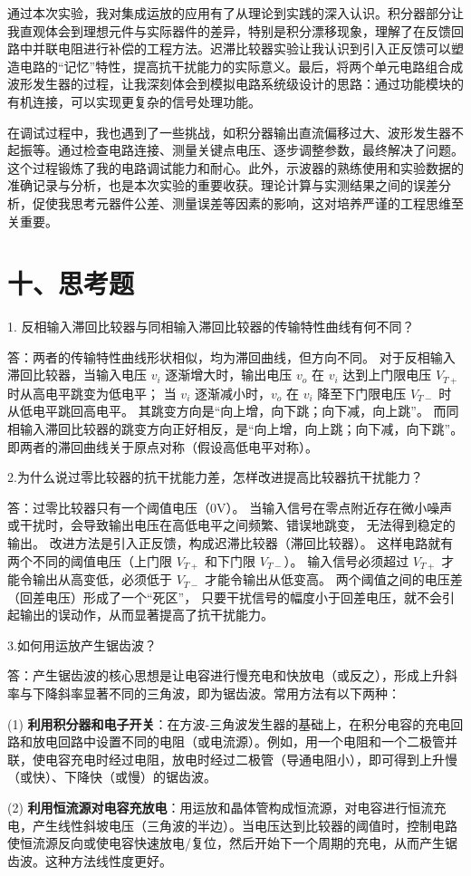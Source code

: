 \documentclass[12pt,a4paper]{article}
\begin{document}
通过本次实验，我对集成运放的应用有了从理论到实践的深入认识。积分器部分让我直观体会到理想元件与实际器件的差异，特别是积分漂移现象，理解了在反馈回路中并联电阻进行补偿的工程方法。迟滞比较器实验让我认识到引入正反馈可以塑造电路的“记忆”特性，提高抗干扰能力的实际意义。最后，将两个单元电路组合成波形发生器的过程，让我深刻体会到模拟电路系统级设计的思路：通过功能模块的有机连接，可以实现更复杂的信号处理功能。

在调试过程中，我也遇到了一些挑战，如积分器输出直流偏移过大、波形发生器不起振等。通过检查电路连接、测量关键点电压、逐步调整参数，最终解决了问题。这个过程锻炼了我的电路调试能力和耐心。此外，示波器的熟练使用和实验数据的准确记录与分析，也是本次实验的重要收获。理论计算与实测结果之间的误差分析，促使我思考元器件公差、测量误差等因素的影响，这对培养严谨的工程思维至关重要。
\section*{十、思考题}
1. 反相输入滞回比较器与同相输入滞回比较器的传输特性曲线有何不同？

答：两者的传输特性曲线形状相似，均为滞回曲线，但方向不同。
对于反相输入滞回比较器，当输入电压 $v_i$ 逐渐增大时，输出电压 $v_o$ 在 $v_i$ 
达到上门限电压 $V_{T+}$ 时从高电平跳变为低电平；
当 $v_i$ 逐渐减小时，$v_o$ 在 $v_i$ 降至下门限电压 $V_{T-}$ 时从低电平跳回高电平。
其跳变方向是“向上增，向下跳；向下减，向上跳”。
而同相输入滞回比较器的跳变方向正好相反，是“向上增，向上跳；向下减，向下跳”。
即两者的滞回曲线关于原点对称（假设高低电平对称）。

2.为什么说过零比较器的抗干扰能力差，怎样改进提高比较器抗干扰能力？

答：过零比较器只有一个阈值电压（$0\mathrm{V}$）。
当输入信号在零点附近存在微小噪声或干扰时，会导致输出电压在高低电平之间频繁、错误地跳变，
无法得到稳定的输出。
改进方法是引入正反馈，构成迟滞比较器（滞回比较器）。
这样电路就有两个不同的阈值电压（上门限 $V_{T+}$ 和下门限 $V_{T-}$）。
输入信号必须超过 $V_{T+}$ 才能令输出从高变低，必须低于 $V_{T-}$ 才能令输出从低变高。
两个阈值之间的电压差（回差电压）形成了一个“死区”，
只要干扰信号的幅度小于回差电压，就不会引起输出的误动作，从而显著提高了抗干扰能力。

3.如何用运放产生锯齿波？

答：产生锯齿波的核心思想是让电容进行慢充电和快放电（或反之），形成上升斜率与下降斜率显著不同的三角波，即为锯齿波。常用方法有以下两种：

(1) \textbf{利用积分器和电子开关}：在方波-三角波发生器的基础上，在积分电容的充电回路和放电回路中设置不同的电阻（或电流源）。例如，用一个电阻和一个二极管并联，使电容充电时经过电阻，放电时经过二极管（导通电阻小），即可得到上升慢（或快）、下降快（或慢）的锯齿波。

(2) \textbf{利用恒流源对电容充放电}：用运放和晶体管构成恒流源，对电容进行恒流充电，产生线性斜坡电压（三角波的半边）。当电压达到比较器的阈值时，控制电路使恒流源反向或使电容快速放电/复位，然后开始下一个周期的充电，从而产生锯齿波。这种方法线性度更好。
\end{document}
